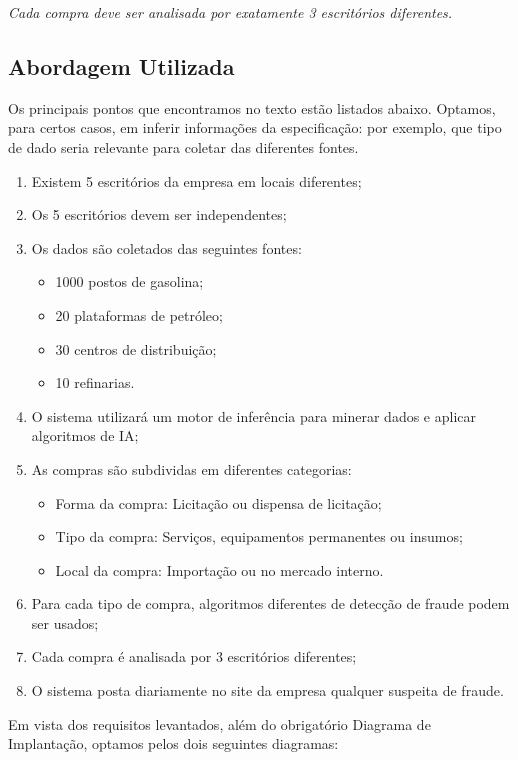 \documentclass[a4paper,10pt]{article}
\begin{document}
\emph{Cada compra deve ser analisada por exatamente 3 escritórios diferentes.} \par

\subsection{Abordagem Utilizada}

Os principais pontos que encontramos no texto estão listados abaixo. Optamos, para
certos casos, em inferir informações da especificação: por exemplo, que tipo de dado
seria relevante para coletar das diferentes fontes.

\begin{enumerate}
  \item Existem 5 escritórios da empresa em locais diferentes;
  \item Os 5 escritórios devem ser independentes;
  \item Os dados são coletados das seguintes fontes:
    \begin{itemize}
      \item 1000 postos de gasolina;
      \item 20 plataformas de petróleo;
      \item 30 centros de distribuição;
      \item 10 refinarias.
    \end{itemize}
  \item O sistema utilizará um motor de inferência para minerar dados e aplicar
        algoritmos de IA;
  \item As compras são subdividas em diferentes categorias:
      \begin{itemize}
        \item Forma da compra: Licitação ou dispensa de licitação;
        \item Tipo da compra: Serviços, equipamentos permanentes ou insumos;
        \item Local da compra: Importação ou no mercado interno.
      \end{itemize}
  \item Para cada tipo de compra, algoritmos diferentes de detecção de fraude
        podem ser usados;
  \item Cada compra é analisada por 3 escritórios diferentes;
  \item O sistema posta diariamente no site da empresa qualquer suspeita de
        fraude.
\end{enumerate}

Em vista dos requisitos levantados, além do obrigatório Diagrama de Implantação,
optamos pelos dois seguintes diagramas:
\end{document}
